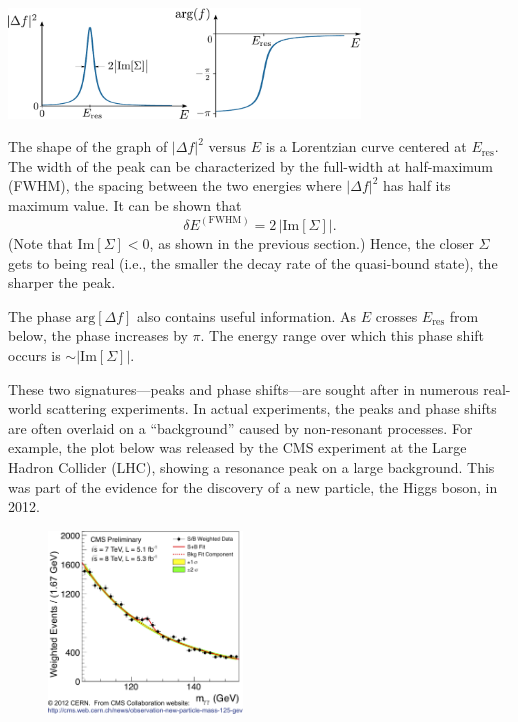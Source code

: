 \documentclass[pra,12pt]{revtex4}
\begin{document}
\begin{center}
  \includegraphics[width=0.7\textwidth]{resonance}  
\end{center}

\noindent
The shape of the graph of $|\Delta f|^2$ versus $E$ is a Lorentzian
curve centered at $E_{\mathrm{res}}$.  The width of the peak can be
characterized by the full-width at half-maximum (FWHM), the spacing
between the two energies where $|\Delta f|^2$ has half its maximum
value.  It can be shown that
\begin{equation}
  \delta E^{(\mathrm{FWHM})} = 2\, \big|\mathrm{Im}[\Sigma]\big|.
\end{equation}
(Note that $\mathrm{Im}[\Sigma] < 0$, as shown in the previous
section.)  Hence, the closer $\Sigma$ gets to being real (i.e., the
smaller the decay rate of the quasi-bound state), the sharper the
peak.

The phase $\mathrm{arg}[\Delta f]$ also contains useful information.
As $E$ crosses $E_{\mathrm{res}}$ from below, the phase increases by
$\pi$.  The energy range over which this phase shift occurs is $\sim
|\mathrm{Im}[\Sigma]|$.

These two signatures---peaks and phase shifts---are sought after in
numerous real-world scattering experiments.  In actual experiments,
the peaks and phase shifts are often overlaid on a ``background''
caused by non-resonant processes.  For example, the plot below was
released by the CMS experiment at the Large Hadron Collider (LHC),
showing a resonance peak on a large background.  This was part of the
evidence for the discovery of a new particle, the Higgs boson, in
2012.

\begin{figure}[h]
  \centering\includegraphics[width=0.46\textwidth]{higgs}
\end{figure}
\end{document}
